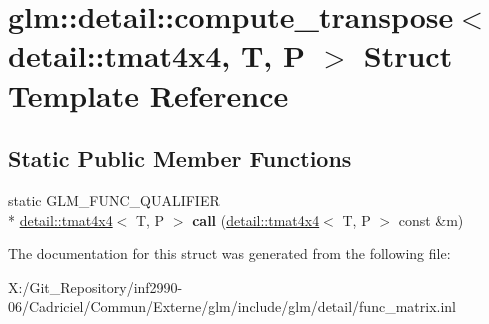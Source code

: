 \hypertarget{structglm_1_1detail_1_1compute__transpose_3_01detail_1_1tmat4x4_00_01_t_00_01_p_01_4}{\section{glm\-:\-:detail\-:\-:compute\-\_\-transpose$<$ detail\-:\-:tmat4x4, T, P $>$ Struct Template Reference}
\label{structglm_1_1detail_1_1compute__transpose_3_01detail_1_1tmat4x4_00_01_t_00_01_p_01_4}
}
\subsection*{Static Public Member Functions}
\begin{DoxyCompactItemize}
\item 
\hypertarget{structglm_1_1detail_1_1compute__transpose_3_01detail_1_1tmat4x4_00_01_t_00_01_p_01_4_af9f856179336704a2eab5c72c6ef79e4}{static G\-L\-M\-\_\-\-F\-U\-N\-C\-\_\-\-Q\-U\-A\-L\-I\-F\-I\-E\-R \\*
\hyperlink{structglm_1_1detail_1_1tmat4x4}{detail\-::tmat4x4}$<$ T, P $>$ {\bfseries call} (\hyperlink{structglm_1_1detail_1_1tmat4x4}{detail\-::tmat4x4}$<$ T, P $>$ const \&m)}\label{structglm_1_1detail_1_1compute__transpose_3_01detail_1_1tmat4x4_00_01_t_00_01_p_01_4_af9f856179336704a2eab5c72c6ef79e4}

\end{DoxyCompactItemize}


The documentation for this struct was generated from the following file\-:\begin{DoxyCompactItemize}
\item 
X\-:/\-Git\-\_\-\-Repository/inf2990-\/06/\-Cadriciel/\-Commun/\-Externe/glm/include/glm/detail/func\-\_\-matrix.\-inl\end{DoxyCompactItemize}

